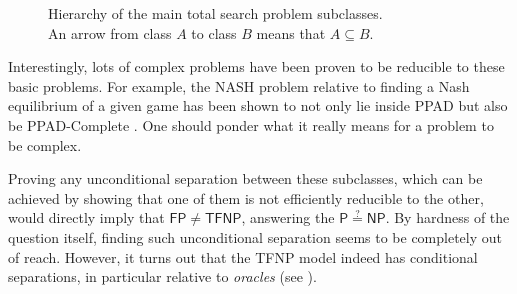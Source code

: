 \newpage

\begin{figure}[H]
    \centering
    
    
    \caption{Hierarchy of the main total search problem subclasses. \\ An arrow from class $A$ to class $B$ means that $A \subseteq B$.}
\end{figure}

Interestingly, lots of complex problems have been proven to be reducible to these basic problems. For example, the $\mathrm{NASH}$ problem relative to finding a Nash equilibrium of a given game has been shown to not only lie inside \textsf{PPAD} but also be \textsf{PPAD}-Complete \cite{nash_1, nash_2}. One should ponder what it really means for a problem to be complex.

Proving any unconditional separation between these subclasses, which can be achieved by showing that one of them is not efficiently reducible to the other, would directly imply that $\mathsf{FP} \neq \mathsf{TFNP}$, answering the $\mathsf{P} \stackrel{?}{=} \mathsf{NP}$. By hardness of the question itself, finding such unconditional separation seems to be completely out of reach. However, it turns out that the \textsf{TFNP} model indeed has conditional separations, in particular relative to \textit{oracles} (see ).
 

